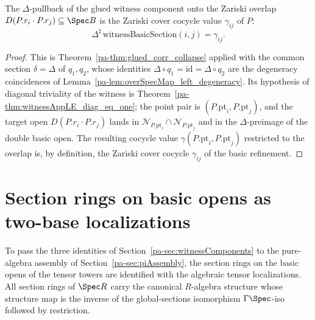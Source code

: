 \begin{theorem}
  \label{pa-thm:witnessBasicSection_collapse}
  \leanok

  The \(\Delta\)-pullback of the glued witness component onto the Zariski overlap
  \(D(P.r_i \cdot P.r_j) \subseteq \Spec B\) is the Zariski cover cocycle value \(\gamma_{ij}\)
  of \(P\):
  \[
    \Delta^{\sharp}\,\mathrm{witnessBasicSection}(i, j) = \gamma_{ij} .
  \]
\end{theorem}
\begin{proof}
  \leanok
  This is Theorem~\ref{pa-thm:glued_corr_collapse} applied with the common section \(\delta =
  \Delta\) of \(q_1, q_2\), whose identities \(\Delta \circ q_1 = \mathrm{id} = \Delta \circ
  q_2\) are the degeneracy coincidences of Lemma~\ref{pa-lem:overSpecMap_left_degeneracy}. Its
  hypothesis of diagonal triviality of the witness is
  Theorem~\ref{pa-thm:witnessAppLE_diag_eq_one}; the point pair is \((P.\mathrm{pt}_i,
  P.\mathrm{pt}_j)\), and the target open \(D(P.r_i \cdot P.r_j)\) lands in \(\mathcal
  N_{P.\mathrm{pt}_i} \cap \mathcal N_{P.\mathrm{pt}_j}\) and in the \(\Delta\)-preimage of the
  double basic open. The resulting cocycle value \(\gamma(P.\mathrm{pt}_i, P.\mathrm{pt}_j)\)
  restricted to the overlap is, by definition, the Zariski cover cocycle \(\gamma_{ij}\) of the
  basic refinement.
\end{proof}

\section{Section rings on basic opens as two-base localizations}
\label{pa-sec:witnessAway}

To pass the three identities of Section~\ref{pa-sec:witnessComponents} to the pure-algebra
assembly of Section~\ref{pa-sec:piAssembly}, the section rings on the basic opens of the tensor
towers are identified with the algebraic tensor localizations. All section rings of
\(\Spec R\) carry the canonical \(R\)-algebra structure whose structure map is the inverse of
the global-sections isomorphism \(\Gamma\Spec\)-iso followed by restriction.


